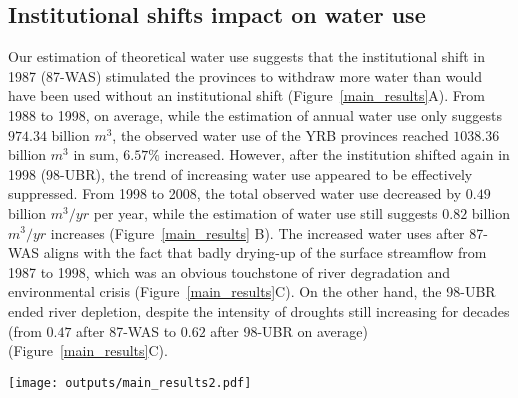 
\subsection{Institutional shifts impact on water use}
\label{result-2}

\label{result-1-p2}
Our estimation of theoretical water use suggests that the institutional shift in 1987 (87-WAS) stimulated the provinces to withdraw more water than would have been used without an institutional shift (Figure~\ref{main_results}A).
From 1988 to 1998, on average, while the estimation of annual water use only suggests $974.34$ billion $m^3$, the observed water use of the YRB provinces reached $1038.36$ billion $m^3$ in sum, $6.57\%$ increased.
However, after the institution shifted again in 1998 (98-UBR), the trend of increasing water use appeared to be effectively suppressed. From 1998 to 2008, the total observed water use decreased by $0.49$ billion $m^3/yr$ per year, while the estimation of water use still suggests $0.82$ billion $m^3/yr$ increases (Figure~\ref{main_results} B).
The increased water uses after 87-WAS aligns with the fact that badly drying-up of the surface streamflow from 1987 to 1998, which was an obvious touchstone of river degradation and environmental crisis (Figure~\ref{main_results}C).
On the other hand, the 98-UBR ended river depletion, despite the intensity of droughts still increasing for decades (from $0.47$ after 87-WAS to $0.62$ after 98-UBR on average) (Figure~\ref{main_results}C).

\begin{figure*}[!tb]
    \centering
    \texttt{[image: outputs/main\_results2.pdf]}
    \caption{
        Effects of two institutional shifts on water resources use and allocation in the Yellow River Basin (YRB).
        \textbf{A.} water uses of the YRB before and after the institutional shift in 1987 (87-WAS);
        \textbf{B.} water uses of the YRB before and after the institutional shift in 1998 (98-UBR). While the blue lines are statistic water use data, the grey ones are the estimation from the Differenced Synthetic Control method with economic and environmental background controlled.
        \textbf{C.} Drought intensity in the YRB and drying up events of the Yellow River. The size of the grey bubbles denotes the length of a drying upstream.
    }
    \label{main_results}
\end{figure*}


